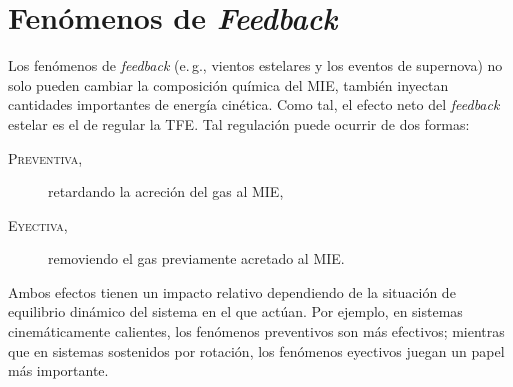 \documentclass{article}
\begin{document}
\section{Fenómenos de \emph{Feedback}}
%
Los fenómenos de \emph{feedback} (e.\,g., vientos estelares y los eventos de supernova) no solo
pueden cambiar la composición química del MIE, también inyectan cantidades importantes de energía
cinética. Como tal, el efecto neto del \emph{feedback} estelar es el de regular la TFE. Tal
regulación puede ocurrir de dos formas:
%
\begin{description}
\item[\textsc{Preventiva,}] retardando la acreción del gas al MIE,
\item[\textsc{Eyectiva,}] removiendo el gas previamente acretado al MIE.
\end{description}
%
Ambos efectos tienen un impacto relativo dependiendo de la situación de equilibrio dinámico del
sistema en el que actúan. Por ejemplo, en sistemas cinemáticamente calientes, los fenómenos
preventivos son más efectivos; mientras que en sistemas sostenidos por rotación, los fenómenos
eyectivos juegan un papel más importante.
\end{document}
